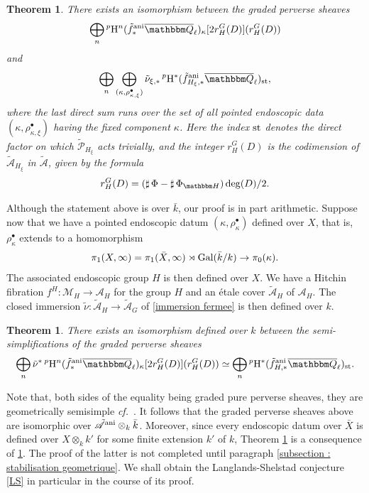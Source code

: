 \documentclass[12pt,english]{smfart}
\numberwithin{equation}{subsection}
\newtheorem{theoreme}[equation]{Theorem}
\theoremstyle{remark}
\newcommand\calA{{\mathscr A}}
\newcommand\calP{{\mathscr P}}
\newcommand\calM{{\mathscr M}}
\newcommand\QQ{{\mathbbm Q}}
\newcommand\HH{{\mathbbm H}}
\newcommand\rmH{{\rm H}}
\newcommand\Gal{{\rm Gal}}
\newcommand\cf{{\it cf.\ }}
\newcommand\ani{{\rm ani}}
\newcommand\Ql{{\overline\QQ_\ell}}
\begin{document}
\begin{theoreme}\label{stabilisation sur tilde A geom}
There exists an isomorphism between the graded perverse sheaves
$$\bigoplus_n {}^p\rmH^n(\tilde f^\ani_*\Ql)_\kappa[2r_H^G(D)](r_H^G(D))$$
and
$$\bigoplus_n \bigoplus_{(\kappa,\rho^\bullet_{\kappa,\xi})} \tilde\nu_{\xi,*}\,{}^p\rmH^*(\tilde f^\ani_{H_\xi,*}\Ql)_{\rm st},$$
where the last direct sum runs over the set of all pointed endoscopic data $(\kappa,\rho^\bullet_{\kappa,\xi})$ having the fixed component $\kappa$. Here the index ${\rm st}$ denotes the direct factor on which $\tilde\calP_{H_\xi}$ acts trivially, and the integer $r_H^G(D)$ is the codimension of $\tilde\calA_{H_\xi}$ in $\tilde\calA$, given by the formula
$$r_H^G(D)=(\sharp\,\Phi-\sharp\,\Phi_\HH)\deg(D)/2.$$
\end{theoreme}

Although the statement above is over $\bar k$, our proof is in part arithmetic. Suppose now that we have a pointed endoscopic datum $(\kappa,\rho_\kappa^\bullet)$ defined over $X$, that is, $\rho_\kappa^\bullet$ extends to a homomorphism
$$\pi_1(X,\infty)=\pi_1(\bar X,\infty)\rtimes\Gal(\bar k/k)\rightarrow\pi_0(\kappa).$$
The associated endoscopic group $H$ is then defined over $X$. We have a Hitchin fibration $f^H:\calM_H\rightarrow\calA_H$ for the group $H$ and an \'etale cover $\tilde\calA_H$ of $\calA_H$. The closed immersion $\tilde\nu:\tilde\calA_H\rightarrow\tilde\calA_G$ of \ref{immersion fermee} is then defined over $k$.

\begin{theoreme}\label{stabilisation sur tilde A}
There exists an isomorphism defined over $k$ between the semi-simplifications of the graded perverse sheaves
$$\bigoplus_n \tilde\nu^*\,{}^p\rmH^n(\tilde f^\ani_*\Ql)_\kappa[2r_H^G(D)](r_H^G(D))\simeq\bigoplus_n {}^p\rmH^*(\tilde f^\ani_{H,*}\Ql)_{\rm st}.$$
\end{theoreme}

Note that, both sides of the equality being graded pure perverse sheaves, they are geometrically semisimple \cf \cite{BBD}. It follows that the graded perverse sheaves above are isomorphic over $\tilde\calA^\ani\otimes_k\bar k$. Moreover, since every endoscopic datum over $\bar X$ is defined over $X\otimes_k k'$ for some finite extension $k'$ of $k$, Theorem \ref{stabilisation sur tilde A geom} is a consequence of \ref{stabilisation sur tilde A}. The proof of the latter is not completed until paragraph \ref{subsection : stabilisation geometrique}. We shall obtain the Langlands-Shelstad conjecture \ref{LS} in particular in the course of its proof.
\end{document}
